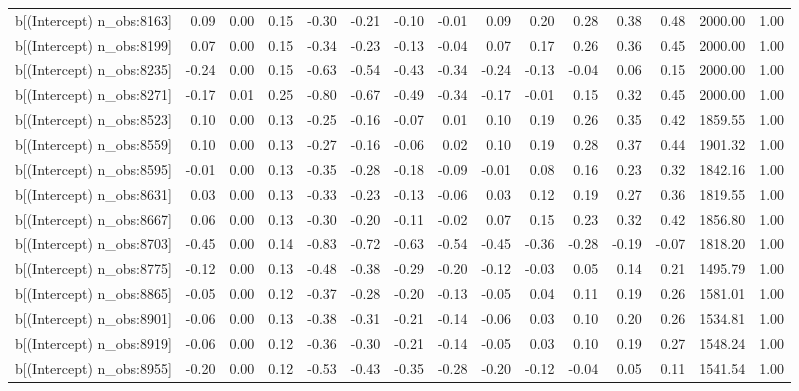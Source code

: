 \begin{table}[ht]
\begin{tabular}{rrrrrrrrrrrrrrr}
  b[(Intercept) n\_obs:8163] & 0.09 & 0.00 & 0.15 & -0.30 & -0.21 & -0.10 & -0.01 & 0.09 & 0.20 & 0.28 & 0.38 & 0.48 & 2000.00 & 1.00 \\ 
  b[(Intercept) n\_obs:8199] & 0.07 & 0.00 & 0.15 & -0.34 & -0.23 & -0.13 & -0.04 & 0.07 & 0.17 & 0.26 & 0.36 & 0.45 & 2000.00 & 1.00 \\ 
  b[(Intercept) n\_obs:8235] & -0.24 & 0.00 & 0.15 & -0.63 & -0.54 & -0.43 & -0.34 & -0.24 & -0.13 & -0.04 & 0.06 & 0.15 & 2000.00 & 1.00 \\ 
  b[(Intercept) n\_obs:8271] & -0.17 & 0.01 & 0.25 & -0.80 & -0.67 & -0.49 & -0.34 & -0.17 & -0.01 & 0.15 & 0.32 & 0.45 & 2000.00 & 1.00 \\ 
  b[(Intercept) n\_obs:8523] & 0.10 & 0.00 & 0.13 & -0.25 & -0.16 & -0.07 & 0.01 & 0.10 & 0.19 & 0.26 & 0.35 & 0.42 & 1859.55 & 1.00 \\ 
  b[(Intercept) n\_obs:8559] & 0.10 & 0.00 & 0.13 & -0.27 & -0.16 & -0.06 & 0.02 & 0.10 & 0.19 & 0.28 & 0.37 & 0.44 & 1901.32 & 1.00 \\ 
  b[(Intercept) n\_obs:8595] & -0.01 & 0.00 & 0.13 & -0.35 & -0.28 & -0.18 & -0.09 & -0.01 & 0.08 & 0.16 & 0.23 & 0.32 & 1842.16 & 1.00 \\ 
  b[(Intercept) n\_obs:8631] & 0.03 & 0.00 & 0.13 & -0.33 & -0.23 & -0.13 & -0.06 & 0.03 & 0.12 & 0.19 & 0.27 & 0.36 & 1819.55 & 1.00 \\ 
  b[(Intercept) n\_obs:8667] & 0.06 & 0.00 & 0.13 & -0.30 & -0.20 & -0.11 & -0.02 & 0.07 & 0.15 & 0.23 & 0.32 & 0.42 & 1856.80 & 1.00 \\ 
  b[(Intercept) n\_obs:8703] & -0.45 & 0.00 & 0.14 & -0.83 & -0.72 & -0.63 & -0.54 & -0.45 & -0.36 & -0.28 & -0.19 & -0.07 & 1818.20 & 1.00 \\ 
  b[(Intercept) n\_obs:8775] & -0.12 & 0.00 & 0.13 & -0.48 & -0.38 & -0.29 & -0.20 & -0.12 & -0.03 & 0.05 & 0.14 & 0.21 & 1495.79 & 1.00 \\ 
  b[(Intercept) n\_obs:8865] & -0.05 & 0.00 & 0.12 & -0.37 & -0.28 & -0.20 & -0.13 & -0.05 & 0.04 & 0.11 & 0.19 & 0.26 & 1581.01 & 1.00 \\ 
  b[(Intercept) n\_obs:8901] & -0.06 & 0.00 & 0.13 & -0.38 & -0.31 & -0.21 & -0.14 & -0.06 & 0.03 & 0.10 & 0.20 & 0.26 & 1534.81 & 1.00 \\ 
  b[(Intercept) n\_obs:8919] & -0.06 & 0.00 & 0.12 & -0.36 & -0.30 & -0.21 & -0.14 & -0.05 & 0.03 & 0.10 & 0.19 & 0.27 & 1548.24 & 1.00 \\ 
  b[(Intercept) n\_obs:8955] & -0.20 & 0.00 & 0.12 & -0.53 & -0.43 & -0.35 & -0.28 & -0.20 & -0.12 & -0.04 & 0.05 & 0.11 & 1541.54 & 1.00 \\ 

\end{tabular}
\end{table}
